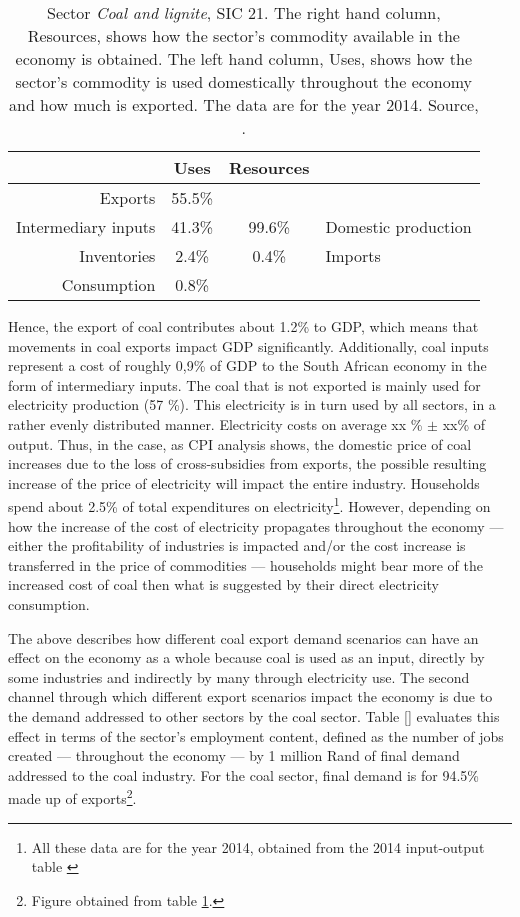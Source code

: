 \documentclass[12pt,english]{article}
\begin{document}
\begin{table}[!h]
	\centering
	\begin{tabular}{rc|cl}
		\hline
		& Uses & Resources  \\ 
		\hline
		Exports & 55.5\% & &\\ 
		Intermediary inputs &  41.3\%  & 99.6\% &  Domestic production\\ 
		Inventories &  2.4\% & 0.4\% & Imports    \\ 
		Consumption & 0.8\% &  &\\ 
		\hline
	\end{tabular}
	\caption{\label{Mining2104_UR}Sector \emph{Coal and lignite}, SIC 21. The right hand column, Resources, shows how the sector's commodity available in the economy is obtained. The left hand column, Uses, shows how the sector's commodity is used domestically throughout the economy and how much is exported. The data are for the year 2014. Source, \cite{IOT2014}.}
\end{table} 

Hence, the export of coal contributes about 1.2\% to GDP, which means that movements in coal exports impact GDP significantly. Additionally, coal inputs represent a cost of roughly 0,9\% of GDP to the South African economy in the form of intermediary inputs. The coal that is not exported is mainly used for electricity production (57 \%). This electricity is in turn used by all sectors, in a rather evenly distributed manner. Electricity costs on average xx \% $\pm$ xx\% of output. Thus, in the case, as CPI analysis shows, the domestic price of coal increases due to the loss of cross-subsidies from exports, the possible resulting increase of the price of electricity will impact the entire industry. Households spend about 2.5\% of total expenditures on electricity\footnote{All these data are for the year 2014, obtained from the 2014 input-output table \citep{IOT2014}}. However, depending on how the increase of the cost of electricity propagates throughout the economy --- either the profitability of industries is impacted and/or the cost increase is transferred in the price of commodities --- households might bear more of the increased cost of coal then what is suggested by their direct electricity consumption.





The above describes how different coal export demand scenarios can have an effect on the economy as a whole because coal is used as an input, directly by some industries and indirectly by many through electricity use. The second channel through which different export scenarios impact the economy is due to the demand addressed to other sectors by the coal sector. Table \ref{} evaluates this effect in terms of the sector's employment content, defined as the number of jobs created --- throughout the economy --- by 1 million Rand of final demand addressed to the coal industry. For the coal sector, final demand is for 94.5\% made up of exports\footnote{Figure obtained from table \ref{Mining2104_UR}.}. 
\end{document}
